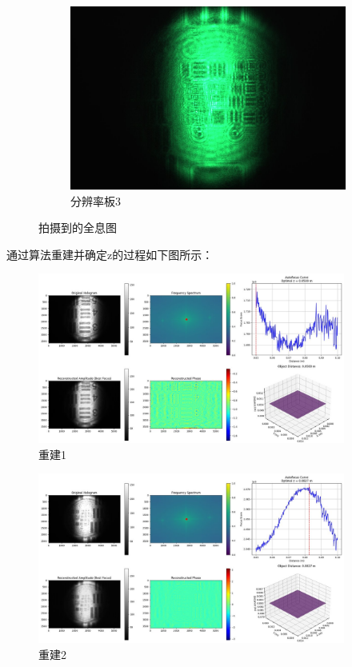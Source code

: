 \documentclass[a4paper]{report} %
\begin{document}
\begin{figure}[H]
\begin{subfigure}{0.3\textwidth}
        \includegraphics[width=\linewidth]{lizhou3.jpg}
        \caption{分辨率板3}
    \end{subfigure}

    \caption{拍摄到的全息图}
\end{figure}
通过算法重建并确定z的过程如下图所示：
\begin{figure}[H]
    \centering
    \includegraphics[width=0.9\textwidth]{离轴1分辨率板.jpg}
    \caption{重建1}
\end{figure}
\begin{figure}[H]
    \centering
    \includegraphics[width=0.9\textwidth]{离轴2分辨率板.jpg}
    \caption{重建2}
\end{figure}
\end{document}
